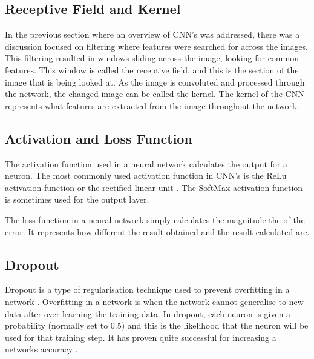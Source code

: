 
\tocless\subsection{Receptive Field and Kernel}
In the previous section where an overview of CNN's was addressed, there was a discussion focused on filtering where features were searched for across the images.
This filtering resulted in windows sliding across the image, looking for common features.
This window is called the receptive field, and this is the section of the image that is being looked at.
As the image is convoluted and processed through the network, the changed image can be called the kernel.
The kernel of the CNN represents what features are extracted from the image throughout the network.

\tocless\subsection{Activation and Loss Function}
The activation function used in a neural network calculates the output for a neuron.
The most commonly used activation function in CNN's is the ReLu activation function or the rectified linear unit \parencite{handsOnML}.
The SoftMax activation function is sometimes used for the output layer.

The loss function in a neural network simply calculates the magnitude the of the error.
It represents how different the result obtained and the result calculated are.

\tocless\subsection{Dropout}
Dropout is a type of regularisation technique used to prevent overfitting in a network \parencite{handsOnML}.
Overfitting in a network is when the network cannot generalise to new data after over learning the training data.
In dropout, each neuron is given a probability (normally set to 0.5) and this is the likelihood that the neuron will be used for that training step.
It has proven quite successful for increasing a networks accuracy \parencite{handsOnML}.

